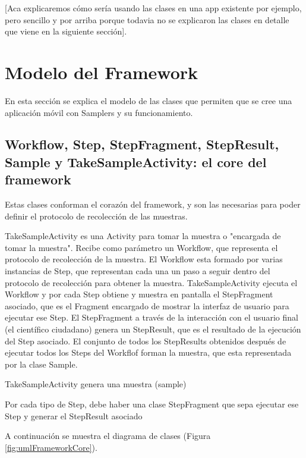 [Aca explicaremos cómo sería usando las clases en una app existente por ejemplo, pero sencillo y por arriba porque todavia no se explicaron las clases en detalle que viene en la siguiente sección].

\section{Modelo del Framework}
En esta sección se explica el modelo de las clases que permiten que se cree una aplicación móvil con Samplers y su funcionamiento.

\subsection{Workflow, Step, StepFragment, StepResult, Sample y TakeSampleActivity: el core del framework}
Estas clases conforman el corazón del framework, y son las necesarias para poder definir el protocolo de recolección de las muestras.

TakeSampleActivity es una Activity para tomar la muestra o "encargada de tomar la muestra".
Recibe como parámetro un Workflow, que representa el protocolo de recolección de la muestra.
El Workflow esta formado por varias instancias de Step, que representan cada una un paso a seguir dentro del protocolo de recolección para obtener la muestra.
TakeSampleActivity ejecuta el Workflow y por cada Step obtiene y muestra en pantalla el StepFragment asociado, que es el Fragment encargado de mostrar la interfaz de usuario para ejecutar ese Step.
El StepFragment a través de la interacción con el usuario final (el científico ciudadano) genera un StepResult, que es el resultado de la ejecución del Step asociado.
El conjunto de todos los StepResults obtenidos después de ejecutar todos los Steps del Workflof forman la muestra, que esta representada por la clase Sample.

TakeSampleActivity genera una muestra (sample)

Por cada tipo de Step, debe haber una clase StepFragment que sepa ejecutar ese Step y generar el StepResult asociado

A continuación se muestra el diagrama de clases (Figura \ref{fig:umlFrameworkCore}).

